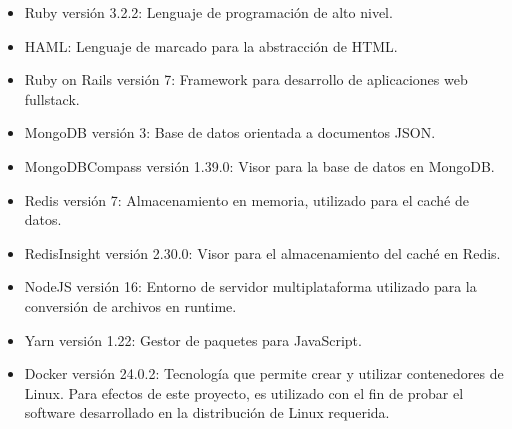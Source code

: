 \begin{itemize}
	
	
	
	
	\item Ruby versión 3.2.2: Lenguaje de programación de alto nivel.
	\item HAML: Lenguaje de marcado para la abstracción de HTML.
	\item Ruby on Rails versión 7: Framework para desarrollo de aplicaciones web fullstack.
	\item MongoDB versión 3: Base de datos orientada a documentos JSON.
	\item MongoDBCompass versión 1.39.0: Visor para la base de datos en MongoDB.
	\item Redis versión 7: Almacenamiento en memoria, utilizado para el caché de datos.
	\item RedisInsight versión 2.30.0: Visor para el almacenamiento del caché en Redis.
	\item NodeJS versión 16: Entorno de servidor multiplataforma utilizado para la conversión de archivos en runtime.
	\item Yarn versión 1.22: Gestor de paquetes para JavaScript.
	\item Docker versión 24.0.2: Tecnología que permite crear y utilizar contenedores de Linux. Para efectos de este proyecto, es utilizado con el fin de probar el software desarrollado en la distribución de Linux requerida.
\end{itemize}
